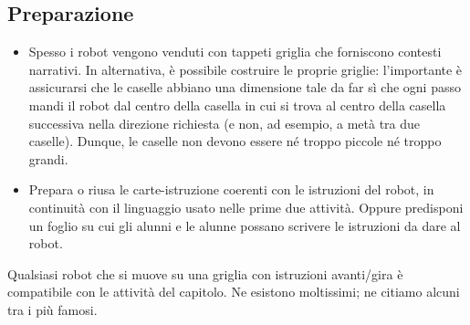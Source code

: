 \subsection{Preparazione }\label{preparazione-3}

\begin{itemize}
\item
  Spesso i robot vengono venduti con tappeti griglia che forniscono contesti narrativi. In alternativa, è possibile costruire le proprie griglie: l'importante è assicurarsi che le caselle abbiano una dimensione tale da far sì che ogni passo mandi il robot dal centro della casella in cui si trova al centro della casella successiva nella direzione richiesta (e non, ad esempio, a metà tra due caselle). Dunque, le caselle non devono essere né troppo piccole né troppo grandi.
\item
  Prepara o riusa le carte-istruzione coerenti con le istruzioni del robot, in continuità con il linguaggio usato nelle prime due attività. Oppure predisponi un foglio su cui gli alunni e le alunne possano scrivere le istruzioni da dare al robot.
\end{itemize}



Qualsiasi robot che si muove su una griglia con istruzioni avanti/gira è compatibile con le attività del capitolo. Ne esistono moltissimi; ne citiamo alcuni tra i più famosi.

